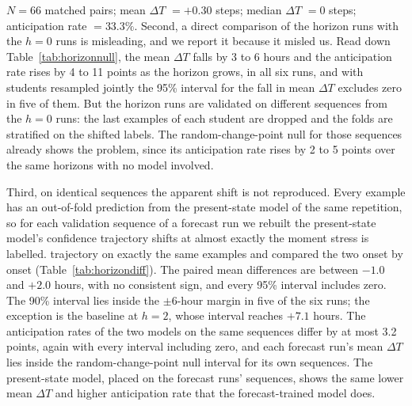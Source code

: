 \documentclass[preprint,12pt,authoryear]{elsarticle}
\newcommand{\dt}{$\Delta T$}
\providecommand{\DIFaddtex}[1]{{\protect\color{blue} \sf #1}} %
\providecommand{\DIFdeltex}[1]{{\protect\color{red} \scriptsize #1}} %
\providecommand{\DIFaddbegin}{} %
\providecommand{\DIFaddend}{} %
\providecommand{\DIFdelbegin}{} %
\providecommand{\DIFdelend}{} %
\providecommand{\DIFadd}[1]{\texorpdfstring{\DIFaddtex{#1}}{#1}} %
\providecommand{\DIFdel}[1]{\texorpdfstring{\DIFdeltex{#1}}{}} %
\newcommand{\DIFscaledelfig}{0.5}
\newlength{\DIFdelgraphicswidth} %
\newlength{\DIFdelgraphicsheight} %
\newcommand{\DIFaddincludegraphics}[2][]{{\color{blue}\fbox{\DIFOincludegraphics[#1]{#2}}}} %
\newcommand{\DIFdelincludegraphics}[2][]{%
\sbox{\DIFdelgraphicsbox}{\DIFOincludegraphics[#1]{#2}}%
\settoboxwidth{\DIFdelgraphicswidth}{\DIFdelgraphicsbox} %
\settoboxtotalheight{\DIFdelgraphicsheight}{\DIFdelgraphicsbox} %
\scalebox{\DIFscaledelfig}{%
\parbox[b]{\DIFdelgraphicswidth}{\usebox{\DIFdelgraphicsbox}\\[-\baselineskip] \rule{\DIFdelgraphicswidth}{0em}}\llap{\resizebox{\DIFdelgraphicswidth}{\DIFdelgraphicsheight}{%
\setlength{\unitlength}{\DIFdelgraphicswidth}%
\begin{picture}(1,1)%
\thicklines\linethickness{2pt} %
{\color[rgb]{1,0,0}\put(0,0){\framebox(1,1){}}}%
{\color[rgb]{1,0,0}\put(0,0){\line( 1,1){1}}}%
{\color[rgb]{1,0,0}\put(0,1){\line(1,-1){1}}}%
\end{picture}%
}\hspace*{3pt}}} %
} %
\DeclareRobustCommand{\DIFaddbegin}{\DIFOaddbegin \let\includegraphics\DIFaddincludegraphics} %
\DeclareRobustCommand{\DIFaddend}{\DIFOaddend \let\includegraphics\DIFOincludegraphics} %
\DeclareRobustCommand{\DIFdelbegin}{\DIFOdelbegin \let\includegraphics\DIFdelincludegraphics} %
\DeclareRobustCommand{\DIFdelend}{\DIFOaddend \let\includegraphics\DIFOincludegraphics} %
\begin{document}
\DIFdel{$N = 66$ matched pairs; mean \dt{} $= +0.30$ steps; median \dt{} $= 0$
steps; anticipation rate $= 33.3\%$.
}\DIFdelend \DIFaddbegin \DIFadd{Second, a direct comparison of the horizon runs with the $h = 0$ runs
is misleading, and we report it because it misled us. Read down
Table~\ref{tab:horizonnull}, the mean \dt{} falls by 3 to 6 hours and the
anticipation rate rises by 4 to 11 points as the horizon grows, in all
six runs, and with students resampled jointly the 95\% interval for the
fall in mean \dt{} excludes zero in five of them. But the horizon runs
are validated on different sequences from the $h = 0$ runs: the last
examples of each student are dropped and the folds are stratified on
the shifted labels. }\DIFaddend The \DIFaddbegin \DIFadd{random-change-point null for those sequences
already shows the problem, since its anticipation rate rises by 2 to 5
points over the same horizons with no model involved.
}

\DIFadd{Third, on identical sequences the apparent shift is not reproduced.
Every example has an out-of-fold prediction from the present-state
model of the same repetition, so for each validation sequence of a
forecast run we rebuilt the present-state }\DIFaddend model's \DIFdelbegin \DIFdel{confidence trajectory shifts at almost exactly
the moment stress is labelled.
}\DIFdelend \DIFaddbegin \DIFadd{trajectory on exactly
the same examples and compared the two onset by onset
(Table~\ref{tab:horizondiff}). The paired mean differences are between
$-1.0$ and $+2.0$ hours, with no consistent sign, and every 95\%
interval includes zero. The 90\% interval lies inside the $\pm 6$-hour
margin in five of the six runs; the exception is the baseline at
$h = 2$, whose interval reaches $+7.1$ hours. The anticipation rates of
the two models on the same sequences differ by at most 3.2 points,
again with every interval including zero, and each forecast run's mean
\dt{} lies inside the random-change-point null interval for its own
sequences. The present-state model, placed on the forecast runs'
sequences, shows the same lower mean \dt{} and higher anticipation rate
that the forecast-trained model does.
}\DIFaddend 
\end{document}
